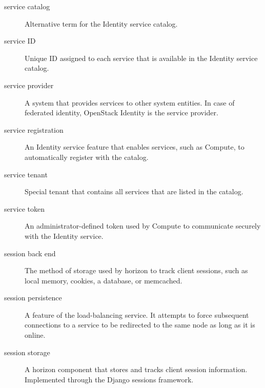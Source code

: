 \documentclass[letterpaper,10pt,english]{sphinxmanual}
\begin{document}
\begin{description}
\item[{service catalog}] \leavevmode{}\label{_source/glossary:term-service-catalog}
Alternative term for the Identity service catalog.

\item[{service ID}] \leavevmode{}\label{_source/glossary:term-service-id}
Unique ID assigned to each service that is available in the
Identity service catalog.

\item[{service provider}] \leavevmode{}\label{_source/glossary:term-service-provider}
A system that provides services to other system entities. In
case of federated identity, OpenStack Identity is the service
provider.

\item[{service registration}] \leavevmode{}\label{_source/glossary:term-service-registration}
An Identity service feature that enables services, such as
Compute, to automatically register with the catalog.

\item[{service tenant}] \leavevmode{}\label{_source/glossary:term-service-tenant}
Special tenant that contains all services that are listed in the
catalog.

\item[{service token}] \leavevmode{}\label{_source/glossary:term-service-token}
An administrator-defined token used by Compute to communicate
securely with the Identity service.

\item[{session back end}] \leavevmode{}\label{_source/glossary:term-session-back-end}
The method of storage used by horizon to track client sessions,
such as local memory, cookies, a database, or memcached.

\item[{session persistence}] \leavevmode{}\label{_source/glossary:term-session-persistence}
A feature of the load-balancing service. It attempts to force
subsequent connections to a service to be redirected to the same node
as long as it is online.

\item[{session storage}] \leavevmode{}\label{_source/glossary:term-session-storage}
A horizon component that stores and tracks client session
information. Implemented through the Django sessions framework.


\end{description}
\end{document}
